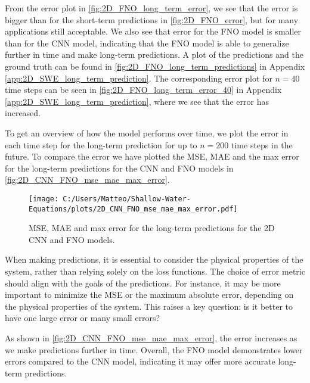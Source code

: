 From the error plot in \autoref{fig:2D_FNO_long_term_error}, we see that the error is bigger than for the short-term predictions in \autoref{fig:2D_FNO_error}, but for many applications still acceptable.
We also see that error for the FNO model is smaller than for the CNN model, indicating that the FNO model is able to generalize further in time and make long-term predictions.
A plot of the predictions and the ground truth can be found in \autoref{fig:2D_FNO_long_term_predictions} in Appendix \autoref{app:2D_SWE_long_term_prediction}.
The corresponding error plot for $n = 40$ time steps can be seen in \autoref{fig:2D_FNO_long_term_error_40} in Appendix \autoref{app:2D_SWE_long_term_prediction}, where we see that the error has increased.

To get an overview of how the model performs over time, we plot the error in each time step for the long-term prediction for up to $n = 200$ time steps in the future.
To compare the error we have plotted the MSE, MAE and the max error for the long-term predictions for the CNN and FNO models in \autoref{fig:2D_CNN_FNO_mse_mae_max_error}.
\begin{figure}[H]
    \centering
    \texttt{[image: C:/Users/Matteo/Shallow-Water-Equations/plots/2D\_CNN\_FNO\_mse\_mae\_max\_error.pdf]}
    \caption{MSE, MAE and max error for the long-term predictions for the 2D CNN and FNO models.}\label{fig:2D_CNN_FNO_mse_mae_max_error}
\end{figure}
When making predictions, it is essential to consider the physical properties of the system, rather than relying solely on the loss functions.
The choice of error metric should align with the goals of the predictions.
For instance, it may be more important to minimize the MSE or the maximum absolute error, depending on the physical properties of the system.
This raises a key question: is it better to have one large error or many small errors?

As shown in \autoref{fig:2D_CNN_FNO_mse_mae_max_error}, the error increases as we make predictions further in time.
Overall, the FNO model demonstrates lower errors compared to the CNN model, indicating it may offer more accurate long-term predictions.











